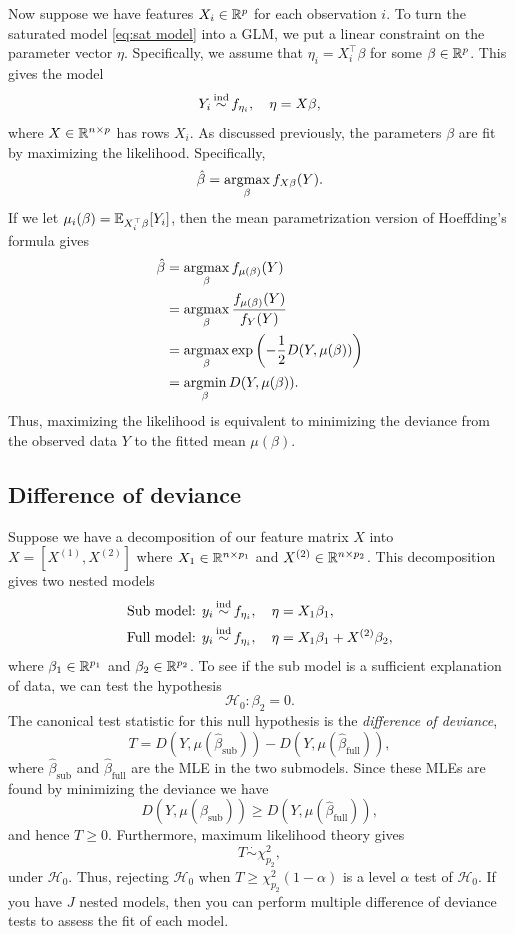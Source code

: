 Now suppose we have features $X_i \in \mathbb{R}^p$ for each observation $i$. To turn the saturated model \eqref{eq:sat model} into a GLM, we put a linear constraint on the parameter vector $\eta$. Specifically, we assume that $\eta_i = X_i^\top \beta$ for some $\beta \in \mathbb{R}^p$. This gives the model
\begin{equation}
        Y_i \simind f_{\eta_i}, \quad \eta = X\beta,
\end{equation}
where $X \in \mathbb{R}^{n \times p}$ has rows $X_i$. As discussed previously, the parameters $\beta$ are fit by maximizing the likelihood. Specifically,
\[\hat{\beta} = \operatorname*{argmax}_\beta f_{X\beta}(Y). \]
If we let $\mu_i(\beta) = {\mathbb E}_{X_i^\top \beta}[Y_i]$, then the mean parametrization version of Hoeffding's formula gives 
\begin{align*}
    \hat{\beta}&=\operatorname*{argmax}_\beta f_{\mu(\beta)}(Y)\\
    &= \operatorname*{argmax}_\beta \frac{f_{\mu(\beta)}(Y)}{f_Y(Y)}\\
    &=\operatorname*{argmax}_\beta \exp\left(-\frac{1}{2}D(Y,\mu(\beta))\right)\\
    &=\operatorname*{argmin}_\beta D(Y,\mu(\beta)).
\end{align*}
Thus, maximizing the likelihood is equivalent to minimizing the deviance from the observed data $Y$ to the fitted mean $\mu(\beta)$. 

\subsection{Difference of deviance}

Suppose we have a decomposition of our feature matrix $X$ into $X = [X^{(1)},X^{(2)}]$ where $X_1\in \mathbb{R}^{n\times p_1}$ and $X^{(2)} \in \mathbb{R}^{n \times p_2}$. This decomposition gives two nested models 
\begin{align*}
    \text{Sub model: } & y_i \simind f_{\eta_i},\quad \eta = X_1\beta_1,\\
    \text{Full model: } & y_i \simind f_{\eta_i},\quad \eta = X_1\beta_1+X^{(2)}\beta_2,
\end{align*}
where $\beta_1 \in \mathbb{R}^{p_1}$ and $\beta_2 \in \mathbb{R}^{p_2}$. To see if the sub model is a sufficient explanation of data, we can test the hypothesis
\[\mathcal{H}_0 : \beta_2 = 0.\]
The canonical test statistic for this null hypothesis is the \emph{difference of deviance},
\[T = D(Y, \mu(\hat{\beta}_{\text{sub}})) - D(Y,\mu(\hat{\beta}_{\text{full}})), \]
where $\hat{\beta}_{\text{sub}}$ and $\hat{\beta}_{\text{full}}$ are the MLE in the two submodels. Since these MLEs are found by minimizing the deviance we have 
\[  D(Y, \mu(\hat{\beta}_{\text{sub}})) \ge D(Y,\mu(\hat{\beta}_{\text{full}})),\]
and hence $T \ge 0$. Furthermore, maximum likelihood theory gives 
\[T \stackrel{\cdot}{\sim} \chi^2_{p_2}, \]
under $\mathcal{H}_0$. Thus, rejecting $\mathcal{H}_0$ when $T \ge \chi^2_{p_2}(1-\alpha)$ is a level $\alpha$ test of $\mathcal{H}_0$. If you have $J$ nested models, then you can perform multiple difference of deviance tests to assess the fit of each model. 

